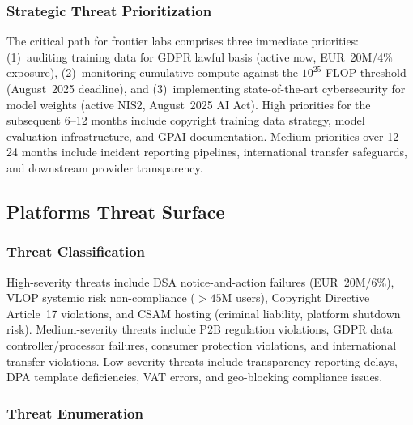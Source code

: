 \documentclass[11pt,a4paper]{article}
\begin{document}
\subsubsection{Strategic Threat Prioritization}

The critical path for frontier labs comprises three immediate priorities: (1)~auditing training data for GDPR lawful basis (active now, EUR~20M/4\% exposure), (2)~monitoring cumulative compute against the $10^{25}$ FLOP threshold (August~2025 deadline), and (3)~implementing state-of-the-art cybersecurity for model weights (active NIS2, August~2025 AI Act). High priorities for the subsequent 6--12 months include copyright training data strategy, model evaluation infrastructure, and GPAI documentation. Medium priorities over 12--24 months include incident reporting pipelines, international transfer safeguards, and downstream provider transparency.


\subsection{Platforms Threat Surface}

\subsubsection{Threat Classification}

High-severity threats include DSA notice-and-action failures (EUR~20M/6\%), VLOP systemic risk non-compliance ($>45$M users), Copyright Directive Article~17 violations, and CSAM hosting (criminal liability, platform shutdown risk). Medium-severity threats include P2B regulation violations, GDPR data controller/processor failures, consumer protection violations, and international transfer violations. Low-severity threats include transparency reporting delays, DPA template deficiencies, VAT errors, and geo-blocking compliance issues.

\subsubsection{Threat Enumeration}
\end{document}
